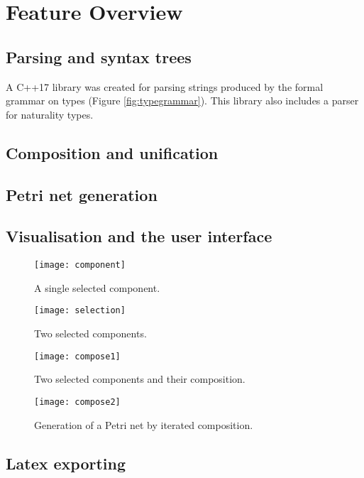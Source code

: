 \documentclass[../Dissertation.tex]{subfiles}
\begin{document}
\section{Feature Overview}

\subsection{Parsing and syntax trees}
A C++17 library was created for parsing strings produced by the formal grammar on types (Figure \ref{fig:typegrammar}). This library also includes a parser for naturality types.

\subsection{Composition and unification}


\subsection{Petri net generation}
\subsection{Visualisation and the user interface}

\begin{figure}[H]
\begin{center}
\texttt{[image: component]}
\end{center}
\caption{A single selected component.}
\label{fig:component}
\end{figure}

\begin{figure}[H]
\begin{center}
\texttt{[image: selection]}
\end{center}
\caption{Two selected components.}
\label{fig:selection}
\end{figure}

\begin{figure}[H]
\begin{center}
\texttt{[image: compose1]}
\end{center}
\caption{Two selected components and their composition.}
\label{fig:compose1}
\end{figure}

\begin{figure}[H]
\begin{center}
\texttt{[image: compose2]}
\end{center}
\caption{Generation of a Petri net by iterated composition.}
\label{fig:compose1}
\end{figure}

\subsection{Latex exporting}
\end{document}
